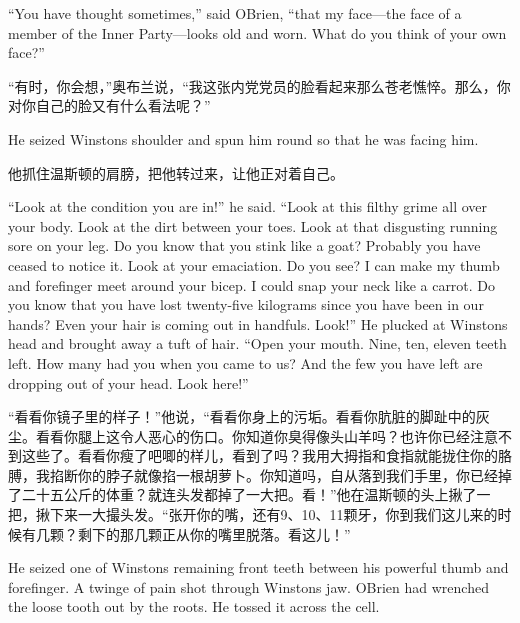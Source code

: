 \begin{paracol}{2}
\switchcolumn*

``You have thought sometimes,'' said O\textquotesingle Brien, ``that my
face---the face of a member of the Inner Party---looks old and worn.
What do you think of your own face?''

\switchcolumn

``有时，你会想，''奥布兰说，``我这张内党党员的脸看起来那么苍老憔悴。那么，你对你自己的脸又有什么看法呢？''

\switchcolumn*

He seized Winston\textquotesingle s shoulder and spun him round so that
he was facing him.

\switchcolumn

他抓住温斯顿的肩膀，把他转过来，让他正对着自己。

\switchcolumn*

``Look at the condition you are in!'' he said. ``Look at this filthy grime
all over your body. Look at the dirt between your toes. Look at that
disgusting running sore on your leg. Do you know that you stink like a
goat? Probably you have ceased to notice it. Look at your emaciation. Do
you see? I can make my thumb and forefinger meet around your bicep. I
could snap your neck like a carrot. Do you know that you have lost
twenty-five kilograms since you have been in our hands? Even your hair
is coming out in handfuls. Look!'' He plucked at
Winston\textquotesingle s head and brought away a tuft of hair. ``Open
your mouth. Nine, ten, eleven teeth left. How many had you when you came
to us? And the few you have left are dropping out of your head. Look
here!''

\switchcolumn

``看看你镜子里的样子！''他说，``看看你身上的污垢。看看你肮脏的脚趾中的灰尘。看看你腿上这令人恶心的伤口。你知道你臭得像头山羊吗？也许你已经注意不到这些了。看看你瘦了吧唧的样儿，看到了吗？我用大拇指和食指就能拢住你的胳膊，我掐断你的脖子就像掐一根胡萝卜。你知道吗，自从落到我们手里，你已经掉了二十五公斤的体重？就连头发都掉了一大把。看！''他在温斯顿的头上揪了一把，揪下来一大撮头发。``张开你的嘴，还有9、10、11颗牙，你到我们这儿来的时候有几颗？剩下的那几颗正从你的嘴里脱落。看这儿！''

\switchcolumn*

He seized one of Winston\textquotesingle s remaining front teeth between
his powerful thumb and forefinger. A twinge of pain shot through
Winston\textquotesingle s jaw. O\textquotesingle Brien had wrenched the
loose tooth out by the roots. He tossed it across the cell.


\end{paracol}
